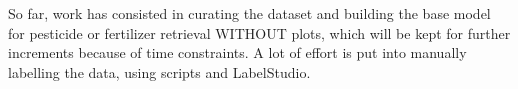So far, work has consisted in curating the dataset and building the base model for pesticide or fertilizer retrieval
WITHOUT plots, which will be kept for further increments because of time constraints. 
A lot of effort is put into manually labelling the data, using scripts and LabelStudio. 